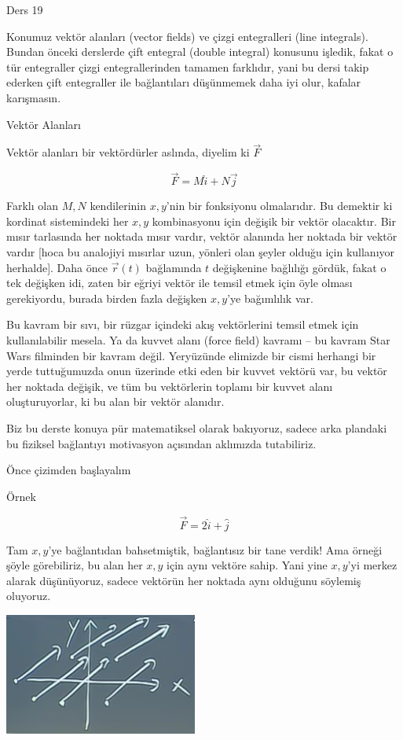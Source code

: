\documentclass[12pt,fleqn]{article}\usepackage{../../common}
\begin{document}
Ders 19

Konumuz vektör alanları (vector fields) ve çizgi entegralleri (line
integrals). Bundan önceki derslerde çift entegral (double integral)
konusunu işledik, fakat o tür entegraller çizgi entegrallerinden tamamen
farklıdır, yani bu dersi takip ederken çift entegraller ile bağlantıları
düşünmemek daha iyi olur, kafalar karışmasın. 

Vektör Alanları

Vektör alanları bir vektördürler aslında, diyelim ki $\vec{F}$

$$ \vec{F} = M\hat{i} + N\vec{j} $$

Farklı olan $M,N$ kendilerinin $x,y$'nin bir fonksiyonu olmalarıdır. Bu
demektir ki kordinat sistemindeki her $x,y$ kombinasyonu için değişik bir
vektör olacaktır. Bir mısır tarlasında her noktada mısır vardır, vektör
alanında her noktada bir vektör vardır [hoca bu analojiyi mısırlar uzun,
yönleri olan şeyler olduğu için kullanıyor herhalde]. Daha önce
$\vec{r}(t)$ bağlamında $t$ değişkenine bağlılığı gördük, fakat o tek
değişken idi, zaten bir eğriyi vektör ile temsil etmek için öyle olması
gerekiyordu, burada birden fazla değişken $x,y$'ye bağımlılık var. 

Bu kavram bir sıvı, bir rüzgar içindeki akış vektörlerini temsil etmek için
kullanılabilir mesela. Ya da kuvvet alanı (force field) kavramı -- bu
kavram Star Wars filminden bir kavram değil. Yeryüzünde elimizde bir cismi
herhangi bir yerde tuttuğumuzda onun üzerinde etki eden bir kuvvet vektörü
var, bu vektör her noktada değişik, ve tüm bu vektörlerin toplamı bir
kuvvet alanı oluşturuyorlar, ki bu alan bir vektör alanıdır. 

Biz bu derste konuya pür matematiksel olarak bakıyoruz, sadece arka
plandaki bu fiziksel bağlantıyı motivasyon açısından aklımızda
tutabiliriz. 

Önce çizimden başlayalım

Örnek

$$ \vec{F} = 2\hat{i} + \hat{j} $$

Tam $x,y$'ye bağlantıdan bahsetmiştik, bağlantısız bir tane verdik! Ama
örneği şöyle görebiliriz, bu alan her $x,y$ için aynı vektöre sahip. Yani
yine $x,y$'yi merkez alarak düşünüyoruz, sadece vektörün her noktada aynı
olduğunu söylemiş oluyoruz.

\begin{center}
\includegraphics[height=4cm]{19_1.png}
\end{center}
\end{document}
